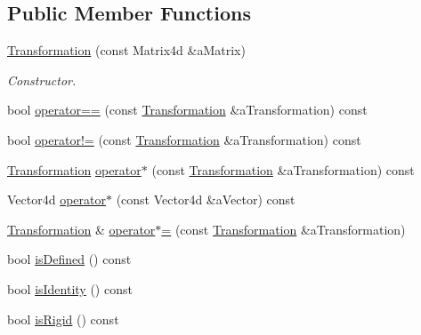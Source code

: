 \subsection*{Public Member Functions}
\begin{DoxyCompactItemize}
\item 
\hyperlink{classostk_1_1math_1_1geom_1_1d3_1_1_transformation_a9823bcddddd66927b3039bf629f53dc6}{Transformation} (const Matrix4d \&a\+Matrix)
\begin{DoxyCompactList}\small\item\em Constructor. \end{DoxyCompactList}\item 
bool \hyperlink{classostk_1_1math_1_1geom_1_1d3_1_1_transformation_aa5d9eecb3349d0a1cc14517212cc2819}{operator==} (const \hyperlink{classostk_1_1math_1_1geom_1_1d3_1_1_transformation}{Transformation} \&a\+Transformation) const
\item 
bool \hyperlink{classostk_1_1math_1_1geom_1_1d3_1_1_transformation_a4f10f8d34eb2351d366be604fb68777f}{operator!=} (const \hyperlink{classostk_1_1math_1_1geom_1_1d3_1_1_transformation}{Transformation} \&a\+Transformation) const
\item 
\hyperlink{classostk_1_1math_1_1geom_1_1d3_1_1_transformation}{Transformation} \hyperlink{classostk_1_1math_1_1geom_1_1d3_1_1_transformation_a11ce1ad2edeb56e2b1cd74deb78539b3}{operator$\ast$} (const \hyperlink{classostk_1_1math_1_1geom_1_1d3_1_1_transformation}{Transformation} \&a\+Transformation) const
\item 
Vector4d \hyperlink{classostk_1_1math_1_1geom_1_1d3_1_1_transformation_a9ecaac5630e049849a43ce5244202471}{operator$\ast$} (const Vector4d \&a\+Vector) const
\item 
\hyperlink{classostk_1_1math_1_1geom_1_1d3_1_1_transformation}{Transformation} \& \hyperlink{classostk_1_1math_1_1geom_1_1d3_1_1_transformation_a6f826a4d90ceb108a4e0f8448ca033b2}{operator$\ast$=} (const \hyperlink{classostk_1_1math_1_1geom_1_1d3_1_1_transformation}{Transformation} \&a\+Transformation)
\item 
bool \hyperlink{classostk_1_1math_1_1geom_1_1d3_1_1_transformation_ae60be568a040e0031d71ec6d56d512d6}{is\+Defined} () const
\item 
bool \hyperlink{classostk_1_1math_1_1geom_1_1d3_1_1_transformation_a177a4ad7f609ef60484c1d37ce8e17ad}{is\+Identity} () const
\item 
bool \hyperlink{classostk_1_1math_1_1geom_1_1d3_1_1_transformation_a3dfd8da8fb50d8358685e8de888a5352}{is\+Rigid} () const

\end{DoxyCompactItemize}
